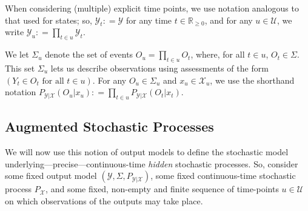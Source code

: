 \documentclass[twoside,11pt]{article}
\newcommand{\reals}{\mathbb{R}}
\newcommand{\realsnonneg}{\reals_{\geq 0}}
\newcommand{\states}{\mathcal{X}}
\newcommand{\observs}{\mathcal{Y}}
\newcommand{\coloneqq}{:\!=}
\begin{document}
When considering (multiple) explicit time points, we use notation analogous to that used for states; so, $\observs_t\coloneqq\observs$ for any time $t\in\realsnonneg$, and for any $u\in\mathcal{U}$, we write $\observs_u\coloneqq \prod_{t\in u}\observs_{t}$. 

We let $\Sigma_u$ denote the set of events $O_u=\prod_{t\in u}O_t$, where, for all $t\in u$, $O_{t}\in\Sigma$. %
This set $\Sigma_u$ lets us describe observations using assessments of the form $(Y_t\in O_t \text{~for all $t\in u$})$. %
For any $O_u\in\Sigma_u$ and $x_u\in\states_u$, we use the shorthand notation $P_{\observs\vert\states}(O_u\vert x_u)\coloneqq \prod_{t\in u}P_{\observs\vert\states}(O_t\vert x_t)$.


\subsection{Augmented Stochastic Processes}\label{sec:aug_stochastic_processes}
We will now use this notion of output models to define the stochastic model underlying---precise---continuous-time \emph{hidden} stochastic processes. 
So, consider some fixed output model $(\observs,\Sigma,P_{\observs\vert\states})$, some fixed continuous-time stochastic process $P_\states$, and some fixed, non-empty and finite sequence of time-points $u\in\mathcal{U}$ on which observations of the outputs may take place. %
\end{document}
